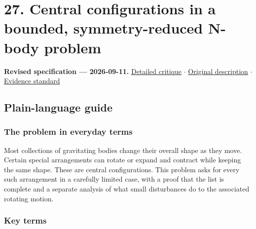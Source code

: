 \documentclass[
  11pt,
]{article}
\begin{document}
\section{27. Central configurations in a bounded, symmetry-reduced
N-body problem}

\textbf{Revised specification --- 2026-09-11.}
\href{https://github.com/rick-stevens-ai/Pure-Thought/blob/main/reviews/27-N-Body-Central-Configurations.md}{Detailed
critique} \ensuremath{\cdot}
\href{https://github.com/rick-stevens-ai/Pure-Thought/blob/main/archive/original-PRDs/27-N-Body-Central-Configurations.md}{Original
description} \ensuremath{\cdot}
\href{https://github.com/rick-stevens-ai/Pure-Thought/blob/main/reviews/EVIDENCE-STANDARD.md}{Evidence
standard}

\subsection{Plain-language guide}

\subsubsection{The problem in everyday terms}

Most collections of gravitating bodies change their overall shape as
they move. Certain special arrangements can rotate or expand and
contract while keeping the same shape. These are central configurations.
This problem asks for every such arrangement in a carefully limited
case, with a proof that the list is complete and a separate analysis of
what small disturbances do to the associated rotating motion.

\subsubsection{Key terms}
\end{document}
